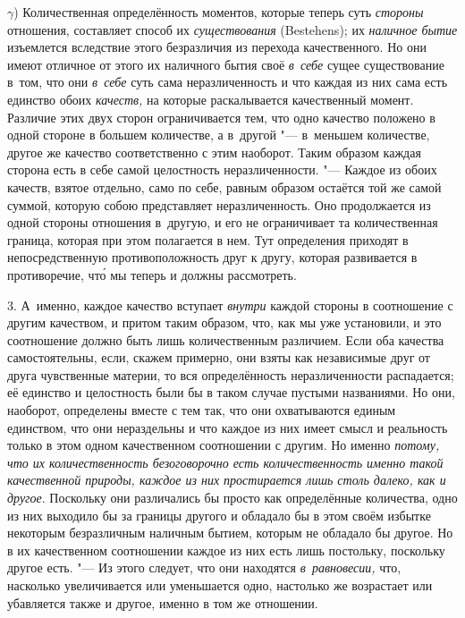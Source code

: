$\gamma$) Количественная определённость моментов, которые теперь суть
{\em стороны} отношения, составляет способ их {\em существования} (Bestehens);
их {\em наличное бытие} изъемлется вследствие этого безразличия из перехода
качественного. Но они имеют отличное от этого их наличного бытия своё
{\em в~себе} сущее существование в~том, что они {\em в~себе} суть сама
неразличенность и что каждая из них сама есть единство обоих {\em качеств,} на
которые раскалывается качественный момент. Различие этих двух сторон
ограничивается тем, что одно качество положено в одной стороне в большем
количестве, а в~другой "--- в~меньшем количестве, другое же качество
соответственно с этим наоборот. Таким образом каждая сторона есть в себе самой
целостность неразличенности. "--- Каждое из обоих качеств, взятое отдельно,
само по себе, равным образом остаётся той же самой суммой, которую собою
представляет неразличенность. Оно продолжается из одной стороны отношения
в~другую, и его не ограничивает та количественная граница, которая при этом
полагается в нем. Тут определения приходят в непосредственную противоположность
друг к другу, которая развивается в противоречие, чт\'{о} мы теперь и должны
рассмотреть.

3. А~именно, каждое качество вступает {\em внутри} каждой стороны в соотношение
с другим качеством, и притом таким образом, что, как мы уже установили, и это
соотношение должно быть лишь количественным различием. Если оба качества
самостоятельны, если, скажем примерно, они взяты как независимые друг от друга
чувственные материи, то вся определённость неразличенности распадается; её
единство и целостность были бы в таком случае пустыми названиями. Но они,
наоборот, определены вместе с тем так, что они охватываются единым единством,
что они нераздельны и что каждое из них имеет смысл и реальность только в этом
одном качественном соотношении с другим. Но именно {\em потому, что их
количественность безоговорочно есть количественность именно такой качественной
природы, каждое из них простирается лишь столь далеко, как и другое}. Поскольку
они различались бы просто как определённые количества, одно из них выходило бы
за границы другого и обладало бы в этом своём избытке некоторым безразличным
наличным бытием, которым не обладало бы другое. Но в их качественном
соотношении каждое из них есть лишь постольку, поскольку другое есть. "--- Из
этого следует, что они находятся {\em в~равновесии,} что, насколько
увеличивается или уменьшается одно, настолько же возрастает или убавляется
также и другое, именно в том же отношении.

